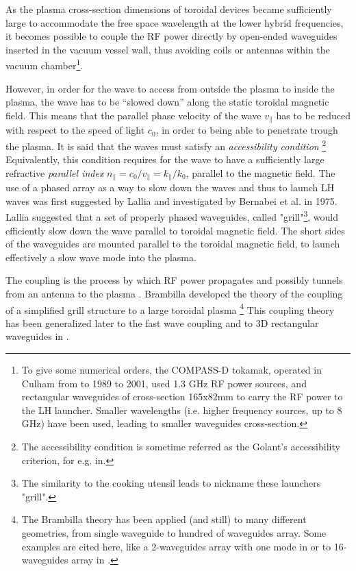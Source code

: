 


As the plasma cross-section dimensions of toroidal devices became sufficiently large to accommodate the free space wavelength at the lower hybrid frequencies, it becomes possible to couple the RF power directly by open-ended waveguides inserted in the vacuum vessel wall, thus avoiding coils or antennas within the vacuum chamber\footnote{To give some numerical orders, the COMPASS-D tokamak, operated in Culham from to 1989 to 2001, used 1.3 GHz RF power sources, and rectangular waveguides of cross-section 165x82mm to carry the RF power to the LH launcher. Smaller wavelengths (i.e. higher frequency sources, up to 8 GHz) have been used, leading to smaller waveguides cross-section.}.

However, in order for the wave to access from outside the plasma to inside the plasma, the wave has to be “slowed down” along the static toroidal magnetic field. This means that the parallel phase velocity of the wave $v_{\parallel}$ has to be reduced with respect to the speed of light $c_0$, in order to being able to penetrate trough the plasma. It is said that the waves must satisfy an \emph{accessibility condition} \footnote{The accessibility condition is sometime referred as the Golant's accessibility criterion, for e.g. in.} Equivalently, this condition requires for the wave to have a sufficiently large refractive \emph{parallel index} $n_{\parallel} = c_0/v_{\parallel} = k_{\parallel}/k_0$, parallel to the magnetic field. The use of a phased array as a way to slow down the waves and thus to launch LH waves was first suggested by Lallia and investigated by Bernabei et al. in 1975. Lallia suggested that a set of properly phased waveguides, called "grill"\footnote{The similarity to the cooking utensil leads to nickname these launchers "grill".}, would efficiently slow down the wave parallel to toroidal magnetic field. The short sides of the waveguides are mounted parallel to the toroidal magnetic field, to launch effectively a slow wave mode into the plasma. 

The coupling is the process by which RF power propagates and possibly tunnels from an antenna to the plasma . Brambilla developed the theory of the coupling of  a simplified grill structure to a large toroidal plasma  \footnote{The Brambilla theory has been applied (and still) to many different geometries, from single waveguide to hundred of waveguides array. Some examples are cited here, like a 2-waveguides array with one mode in  or to 16-waveguides array in .} This coupling theory has been generalized later to the fast wave coupling  and to 3D rectangular waveguides in . 

